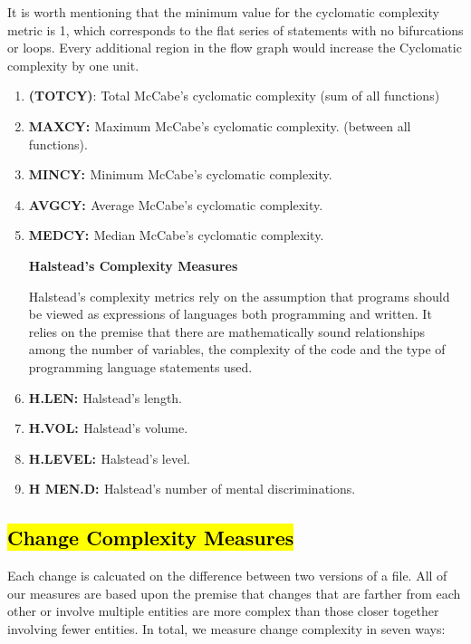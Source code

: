 \documentclass[8pt,twocolumn,a4paper]{article}
\begin{document}
It is worth mentioning that the minimum value for the cyclomatic complexity metric is 1, which corresponds to the flat series of statements with no bifurcations or loops. Every additional region in the flow graph would increase the Cyclomatic complexity by one unit.
\begin{enumerate}
\item{\bf{ (TOTCY)}}: Total McCabe's cyclomatic complexity (sum of all functions)
\item{\bf{MAXCY: }} Maximum McCabe’s cyclomatic complexity. (between all functions).

\item{\bf{MINCY: }} Minimum McCabe’s cyclomatic complexity.
\item{\bf{AVGCY: }} Average McCabe’s cyclomatic complexity.
\item{\bf{MEDCY: }} Median McCabe’s cyclomatic complexity.

{\bf{Halstead's Complexity Measures}}

Halstead’s complexity metrics rely on the assumption that programs should be viewed as expressions of languages both programming and written. It relies on the premise that there are mathematically sound relationships among the number of variables, the complexity of the code and the type of programming language statements used.

\item{\bf{H.LEN: }}Halstead’s length.
\item{\bf{H.VOL: }}Halstead's volume.

\item{\bf{H.LEVEL: }}Halstead’s level.

\item{\bf{H MEN.D: }}Halstead’s number of mental discriminations.



\end{enumerate}

\subsection{\hl{Change Complexity Measures}}


Each change is calcuated on the difference between two versions of a file.
%
All of our measures are based upon the premise that changes that are farther
from each other or involve multiple entities are more complex than those closer
together involving fewer entities. 
%
In total, we measure change complexity in seven ways:
\end{document}
